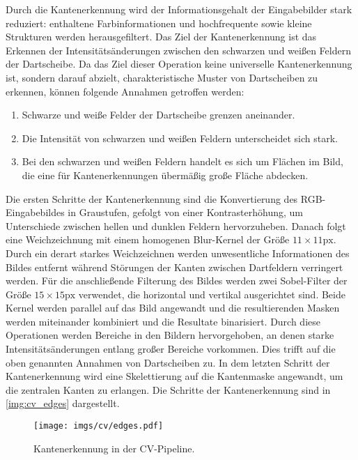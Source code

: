 Durch die Kantenerkennung wird der Informationsgehalt der Eingabebilder stark reduziert: enthaltene Farbinformationen und hochfrequente sowie kleine Strukturen werden herausgefiltert. Das Ziel der Kantenerkennung ist das Erkennen der Intensitätsänderungen zwischen den schwarzen und weißen Feldern der Dartscheibe. Da das Ziel dieser Operation keine universelle Kantenerkennung ist, sondern darauf abzielt, charakteristische Muster von Dartscheiben zu erkennen, können folgende Annahmen getroffen werden:

\begin{enumerate}
    \item Schwarze und weiße Felder der Dartscheibe grenzen aneinander.
    \item Die Intensität von schwarzen und weißen Feldern unterscheidet sich stark.
    \item Bei den schwarzen und weißen Feldern handelt es sich um Flächen im Bild, die eine für Kantenerkennungen übermäßig große Fläche abdecken.
\end{enumerate}

Die ersten Schritte der Kantenerkennung sind die Konvertierung des RGB-Eingabebildes in Graustufen, gefolgt von einer Kontrasterhöhung, um Unterschiede zwischen hellen und dunklen Feldern hervorzuheben. Danach folgt eine Weichzeichnung mit einem homogenen Blur-Kernel der Größe $11\times11\text{px}$. Durch ein derart starkes Weichzeichnen werden unwesentliche Informationen des Bildes entfernt während Störungen der Kanten zwischen Dartfeldern verringert werden. Für die anschließende Filterung des Bildes werden zwei Sobel-Filter der Größe $15\times15\text{px}$ verwendet, die horizontal und vertikal ausgerichtet sind. Beide Kernel werden parallel auf das Bild angewandt und die resultierenden Masken werden miteinander kombiniert und die Resultate binarisiert. Durch diese Operationen werden Bereiche in den Bildern hervorgehoben, an denen starke Intensitätsänderungen entlang großer Bereiche vorkommen. Dies trifft auf die oben genannten Annahmen von Dartscheiben zu. In dem letzten Schritt der Kantenerkennung wird eine Skelettierung auf die Kantenmaske angewandt, um die zentralen Kanten zu erlangen. Die Schritte der Kantenerkennung sind in \autoref{img:cv_edges} dargestellt.

\begin{figure}
    \centering
    \texttt{[image: imgs/cv/edges.pdf]}
    \caption{Kantenerkennung in der CV-Pipeline.}
    \label{img:cv_edges}
\end{figure}

